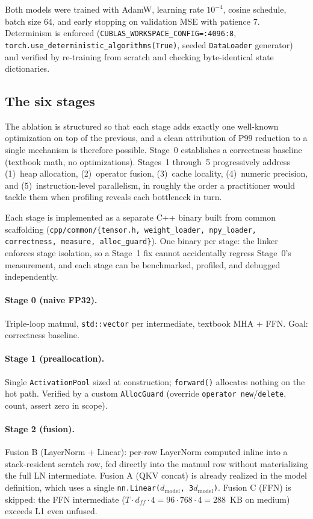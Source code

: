 \documentclass{article}
\begin{document}
Both models were trained with AdamW, learning rate $10^{-4}$, cosine schedule, batch size 64, and early stopping on validation MSE with patience 7.
Determinism is enforced (\texttt{CUBLAS\_WORKSPACE\_CONFIG=:4096:8}, \texttt{torch.use\_deterministic\_algorithms(True)}, seeded \texttt{DataLoader} generator) and verified by re-training from scratch and checking byte-identical state dictionaries.

\subsection{The six stages}
\label{sec:method:stages}

The ablation is structured so that each stage adds exactly one well-known optimization on top of the previous, and a clean attribution of P99 reduction to a single mechanism is therefore possible.
Stage~0 establishes a correctness baseline (textbook math, no optimizations).
Stages~1 through~5 progressively address (1)~heap allocation, (2)~operator fusion, (3)~cache locality, (4)~numeric precision, and (5)~instruction-level parallelism, in roughly the order a practitioner would tackle them when profiling reveals each bottleneck in turn.

Each stage is implemented as a separate C++ binary built from common scaffolding (\texttt{cpp/common/\{tensor.h, weight\_loader, npy\_loader, correctness, measure, alloc\_guard\}}).
One binary per stage: the linker enforces stage isolation, so a Stage~1 fix cannot accidentally regress Stage~0's measurement, and each stage can be benchmarked, profiled, and debugged independently.

\paragraph{Stage 0 (naive FP32).}
Triple-loop matmul, \texttt{std::vector} per intermediate, textbook MHA + FFN. Goal: correctness baseline.

\paragraph{Stage 1 (preallocation).}
Single \texttt{ActivationPool} sized at construction; \texttt{forward()} allocates nothing on the hot path.
Verified by a custom \texttt{AllocGuard} (override \texttt{operator new}/\texttt{delete}, count, assert zero in scope).

\paragraph{Stage 2 (fusion).}
Fusion B (LayerNorm + Linear): per-row LayerNorm computed inline into a stack-resident scratch row, fed directly into the matmul row without materializing the full LN intermediate.
Fusion A (QKV concat) is already realized in the model definition, which uses a single \texttt{nn.Linear($d_\text{model}$, 3$d_\text{model}$)}.
Fusion C (FFN) is skipped: the FFN intermediate ($T \cdot d_{ff} \cdot 4 = 96 \cdot 768 \cdot 4 = 288$~KB on medium) exceeds L1 even unfused.
\end{document}

